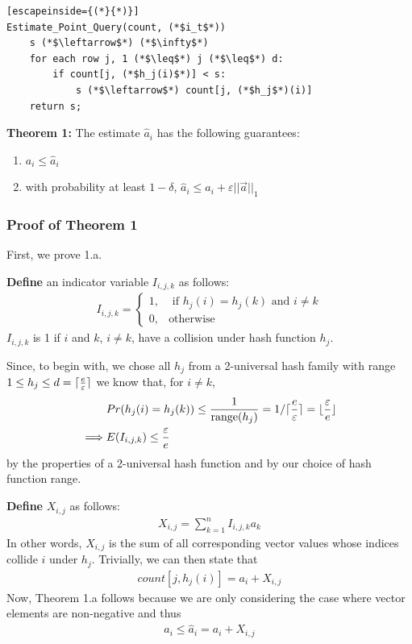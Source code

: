 \documentclass[11pt]{article}
\DeclarePairedDelimiter\ceil{\lceil}{\rceil}
\DeclarePairedDelimiter\floor{\lfloor   }{\rfloor}
\begin{document}
\begin{lstlisting}[escapeinside={(*}{*)}]
Estimate_Point_Query(count, (*$i_t$*)) 
    s (*$\leftarrow$*) (*$\infty$*)
    for each row j, 1 (*$\leq$*) j (*$\leq$*) d:
        if count[j, (*$h_j(i)$*)] < s:
            s (*$\leftarrow$*) count[j, (*$h_j$*)(i)]
    return s;
\end{lstlisting}

\textbf{Theorem 1:} The estimate $\hat a_i$ has the following guarantees:
\begin{enumerate}[label=\textnormal{(\arabic*)}]
    \item $a_i \leq \hat{a}_i$
    \item with probability at least $1 - \delta$, $\hat{a}_i \leq a_i + \varepsilon ||\vec{a}||_1$
\end{enumerate}
\subsubsection{Proof of Theorem 1}
First, we prove 1.a.  

\textbf{Define} an indicator variable $I_{i, j, k}$ as follows:
\begin{align}
    I_{i, j, k} = 
    \begin{cases}
        1, & \text{ if } h_j(i) = h_j(k) \text{ and } i \neq k \\
        0, & \text{otherwise}
    \end{cases}
\end{align}
$I_{i, j, k}$ is 1 if $i$ and $k$, $i \neq k$, have a collision under hash function $h_j$.

Since, to begin with, we chose all $h_j$ from a 2-universal hash family
with range $1 \leq h_j \leq d = \ceil{\frac{e}{\varepsilon}}$ 
we know that, for $i \neq k$,
\begin{align}\label{eq:collision-prob}
    &Pr(h_j(i) = h_j(k)) \leq \frac{1}{\text{range}(h_j)} = 1/\ceil{\frac{e}{\varepsilon}} = \floor{\frac{\varepsilon}{e}} \nonumber\\
    \implies &E(I_{i, j, k}) \leq \frac{\varepsilon}{e}
\end{align}
by the properties of a 2-universal hash function and by our choice of hash function
range.

\textbf{Define} $X_{i, j}$ as follows:
\begin{align}
    X_{i, j} = \sum_{k = 1}^{n}I_{i, j, k} a_k
\end{align}
In other words, $X_{i, j}$ is the sum of all corresponding vector values whose indices
collide $i$ under $h_j$. Trivially, we can then state that
\begin{align}\label{eq:count-def}
    count[j, h_j(i)] = a_i + X_{i, j} 
\end{align}
Now, Theorem 1.a follows because we are only considering the case where vector
elements are non-negative and thus
\begin{align}
    a_i \leq \hat a_i = a_i + X_{i, j}
\end{align}
\end{document}
